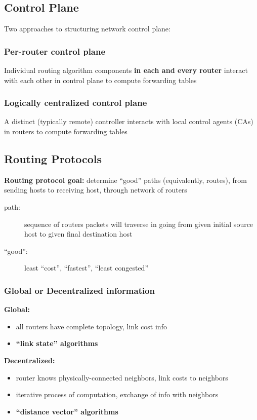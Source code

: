 \subsection{Control Plane}
Two approaches to structuring network control plane:
\subsubsection{Per-router control plane}
\begin{leftbar}
	Individual routing algorithm components \textbf{in each and every router} interact with each other in control plane to compute forwarding tables
\end{leftbar}
\subsubsection{Logically centralized control plane}
\begin{leftbar}
	A distinct (typically remote) controller interacts with local control agents (CAs) in routers to compute forwarding tables
\end{leftbar}

\subsection{Routing Protocols}
\begin{leftbar}
	\textbf{Routing protocol goal:} determine ``good'' paths (equivalently, routes), from sending hosts to receiving host, through network of routers
	\begin{description}
		\item[path:] sequence of routers packets will traverse in going from given initial source host to given final destination host
		\item[``good'':] least ``cost'', ``fastest'', ``least congested''
	\end{description}
\end{leftbar}
\subsubsection{Global or Decentralized information}
\textbf{Global:}
\begin{itemize}
	\item all routers have complete topology, link cost info
	\item \textbf{``link state'' algorithms}
\end{itemize}
\textbf{Decentralized:}
\begin{itemize}
	\item router knows physically-connected neighbors, link costs to neighbors
	\item iterative process of computation, exchange of info with neighbors
	\item \textbf{``distance vector'' algorithms}
\end{itemize}
